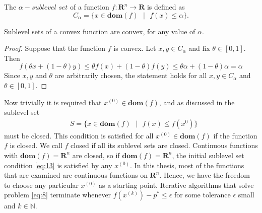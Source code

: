\begin{definition}
\cite[75]{boyd2004convex}  
The $\alpha-\textit{sublevel set}$ of a function $f: \mathbf{R}^{n} \longrightarrow \mathbf{R}$ is defined as $$C_{\alpha} = \{x \in \textbf{dom} (f) \text{ }|\text{ } f(x) \leq \alpha\}.$$
\end{definition}
\begin{remark}
\cite[75]{boyd2004convex}  
Sublevel sets of a convex function are convex, for any value of $\alpha$.
\end{remark}
\begin{proof}
Suppose that the function $f$ is convex. Let $x,y \in C_{\alpha}$ and fix $\theta \in [0,1]$. Then $$f(\theta x + (1-\theta)y) \leq \theta f(x) + (1-\theta)f(y) \leq \theta \alpha + (1-\theta)\alpha = \alpha$$
Since $x,y$ and $\theta$ are arbitrarily chosen, the statement holds for all $x,y \in C_{\alpha}$ and $\theta \in [0,1]$.
\end{proof} 
Now trivially it is required that $x^{(0)} \in \textbf{dom} (f)$, and as discussed in \cite[457]{boyd2004convex} the sublevel set 
\begin{equation*}\label{eq:13}\tag{2.3.2}
\begin{aligned}
    &S = \{x \in \textbf{dom} (f) \text{ }|\text{ } f(x) \leq f(x^{0})\}
\end{aligned}
\end{equation*}
must be closed. This condition is satisfied for all $x^{(0)} \in \textbf{dom} (f)$ if the function $f$ is closed. We call $f$ closed if all its sublevel sets are closed. Continuous functions with $\textbf{dom} (f) = \mathbf{R}^{n}$ are closed, so if $\textbf{dom} (f) = \mathbf{R}^{n}$, the initial sublevel set condition \ref{eq:13} is satisfied by any $x^{(0)}$. In this thesis, most of the functions that are examined are continuous functions on $\mathbf{R}^{n}.$ Hence, we have the freedom to choose any particular $x^{(0)}$ as a starting point. Iterative algorithms that solve problem \eqref{eq:8} terminate whenever $f(x^{(k)}) - p^{*} \leq \epsilon$ for some tolerance $\epsilon$ small and $k \in \mathbb{N}$.








